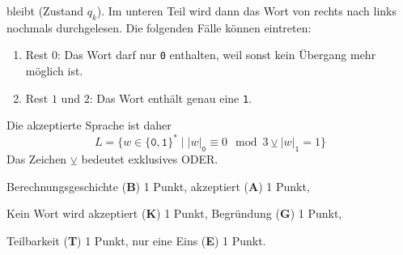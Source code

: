 \begin{loesung}
\begin{teilaufgaben}
bleibt (Zustand $q_k$).
Im unteren Teil wird dann das Wort von rechts nach links nochmals
durchgelesen.
Die folgenden Fälle können eintreten:
\begin{enumerate}
\item Rest 0: Das Wort darf nur \texttt{0} enthalten, weil sonst kein
Übergang mehr möglich ist.
\item Rest $1$ und $2$: Das Wort enthält genau eine \texttt{1}.
\end{enumerate}
Die akzeptierte Sprache ist daher
\[
L
=
\{
w\in\{\texttt{0},\texttt{1}\}^*
\mid
|w|_{\texttt{0}}\equiv 0\mod 3
\veebar
|w|_{\texttt{1}}=1
\}
\]
Das Zeichen $\veebar$ bedeutet exklusives ODER.
\qedhere
\end{teilaufgaben}
\end{loesung}

\begin{bewertung}
\begin{teilaufgaben}
\item
Berechnungsgeschichte ({\bf B}) 1 Punkt,
akzeptiert ({\bf A}) 1 Punkt,
\item
Kein Wort wird akzeptiert ({\bf K}) 1 Punkt,
Begründung ({\bf G}) 1 Punkt,
\item
Teilbarkeit ({\bf T}) 1 Punkt,
nur eine Eins ({\bf E}) 1 Punkt.
\end{teilaufgaben}
\end{bewertung}
